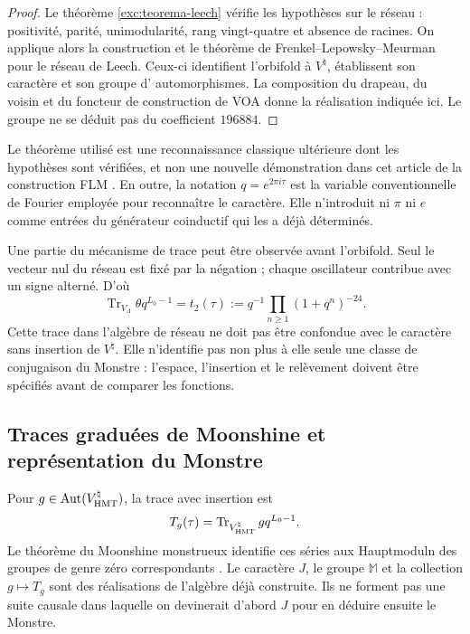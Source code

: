 \begin{proof}
Le théorème \ref{exc:teorema-leech} vérifie les hypothèses sur le réseau :
positivité, parité, unimodularité, rang vingt-quatre et absence de
racines. On applique alors la construction et le théorème de
Frenkel--Lepowsky--Meurman pour le réseau de Leech. Ceux-ci identifient
l'orbifold à $V^\natural$, établissent son caractère et son groupe d'
automorphismes. La composition du drapeau, du voisin et du foncteur
de construction de VOA donne la réalisation indiquée ici. Le groupe ne se déduit
pas du coefficient $196884$.
\end{proof}

Le théorème utilisé est une reconnaissance classique ultérieure dont les hypothèses sont vérifiées, et non une nouvelle démonstration dans cet article de la construction FLM \cite{flm}. En outre, la notation $q=e^{2\pi i\tau}$ est la variable conventionnelle de Fourier employée pour reconnaître le caractère. Elle n'introduit ni $\pi$ ni $e$ comme entrées du générateur coinductif qui les a déjà déterminés.

Une partie du mécanisme de trace peut être observée avant l'orbifold.
Seul le vecteur nul du réseau est fixé par la négation ; chaque
oscillateur contribue avec un signe alterné. D'où
\[
 \operatorname{Tr}_{V_\Lambda}\theta q^{L_0-1}
   =t_2(\tau)
   :=q^{-1}\prod_{n\geq1}(1+q^n)^{-24}.
\]
Cette trace dans l'algèbre de réseau ne doit pas être confondue avec le
caractère sans insertion de $V^\natural$. Elle n'identifie pas non plus à elle
seule une classe de conjugaison du Monstre : l'espace, l'insertion
et le relèvement doivent être spécifiés avant de comparer les fonctions.







\subsection{Traces graduées de Moonshine et représentation du Monstre}
\label{exc:alcance}

Pour $g\in\operatorname{Aut}(V^\natural_{\rm HMT})$, la trace avec insertion est
\[
 T_g(\tau)=
 \operatorname{Tr}_{V^\natural_{\rm HMT}}gq^{L_0-1}.
\]
Le théorème du Moonshine monstrueux identifie ces séries aux
Hauptmoduln des groupes de genre zéro correspondants
\cite[théorème~1.1]{borcherds}.
Le caractère $J$, le groupe $\mathbb M$ et la collection $g\mapsto T_g$
sont des réalisations de l'algèbre déjà construite. Ils ne forment pas une suite
causale dans laquelle on devinerait d'abord $J$ pour en déduire ensuite le Monstre.

